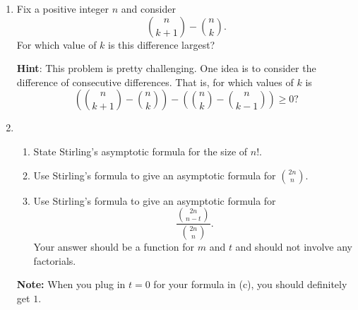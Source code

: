 \documentclass[11pt]{article}
\begin{document}
\begin{enumerate}
\item Fix a positive integer $n$ and consider 
\[
\binom{n}{k+1} - \binom{n}{k}.
\]
For which value of $k$ is this difference largest?

{\bf Hint}:  This problem is pretty challenging.  One idea is to consider the difference of consecutive differences.  That is, for which values of $k$ is
\[
\left(\binom{n}{k+1} - \binom{n}{k}\right) - \left(\binom{n}{k} - \binom{n}{k-1}\right) \ge 0?
\]

\item \begin{enumerate}

\item State Stirling's asymptotic formula for the size of $n!$.

\item Use Stirling's formula to give an asymptotic formula for $\binom{2n}{n}$.

\item Use Stirling's formula to give an asymptotic formula for
\[
\frac{\binom{2n}{n-t}}{\binom{2n}{n}}.
\]
Your answer should be a function for $m$ and $t$ and should not involve any factorials.  


\end{enumerate}

{\bf Note:} When you plug in $t=0$ for your formula in (c), you should definitely get $1$.







\end{enumerate}
\end{document}
